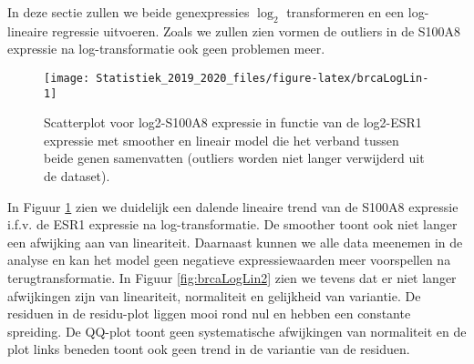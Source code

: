 \documentclass[12pt,dutch,coursenotes]{book}
\newenvironment{Shaded}{\begin{snugshade}}{\end{snugshade}}
\newcommand{\KeywordTok}[1]{\textcolor[rgb]{0.13,0.29,0.53}{\textbf{#1}}}
\newcommand{\DataTypeTok}[1]{\textcolor[rgb]{0.13,0.29,0.53}{#1}}
\newcommand{\DecValTok}[1]{\textcolor[rgb]{0.00,0.00,0.81}{#1}}
\newcommand{\StringTok}[1]{\textcolor[rgb]{0.31,0.60,0.02}{#1}}
\newcommand{\OperatorTok}[1]{\textcolor[rgb]{0.81,0.36,0.00}{\textbf{#1}}}
\newcommand{\NormalTok}[1]{#1}
\theoremstyle{definition}
\theoremstyle{definition}
\theoremstyle{definition}
\theoremstyle{remark}
\begin{document}
In deze sectie zullen we beide genexpressies \(\log_2\) transformeren en
een log-lineaire regressie uitvoeren. Zoals we zullen zien vormen de
outliers in de S100A8 expressie na log-transformatie ook geen problemen
meer.

\begin{Shaded}
\end{Shaded}

\begin{figure}

{\centering \texttt{[image: Statistiek\_2019\_2020\_files/figure-latex/brcaLogLin-1]} 

}

\caption{Scatterplot voor log2-S100A8 expressie in functie van de log2-ESR1 expressie met smoother en lineair model die het verband tussen beide genen samenvatten (outliers worden niet langer verwijderd uit de dataset).}\label{fig:brcaLogLin}
\end{figure}

In Figuur \ref{fig:brcaLogLin} zien we duidelijk een dalende lineaire
trend van de S100A8 expressie i.f.v. de ESR1 expressie na
log-transformatie. De smoother toont ook niet langer een afwijking aan
van lineariteit. Daarnaast kunnen we alle data meenemen in de analyse en
kan het model geen negatieve expressiewaarden meer voorspellen na
terugtransformatie. In Figuur \ref{fig:brcaLogLin2} zien we tevens dat
er niet langer afwijkingen zijn van lineariteit, normaliteit en
gelijkheid van variantie. De residuen in de residu-plot liggen mooi rond
nul en hebben een constante spreiding. De QQ-plot toont geen
systematische afwijkingen van normaliteit en de plot links beneden toont
ook geen trend in de variantie van de residuen.
\end{document}

